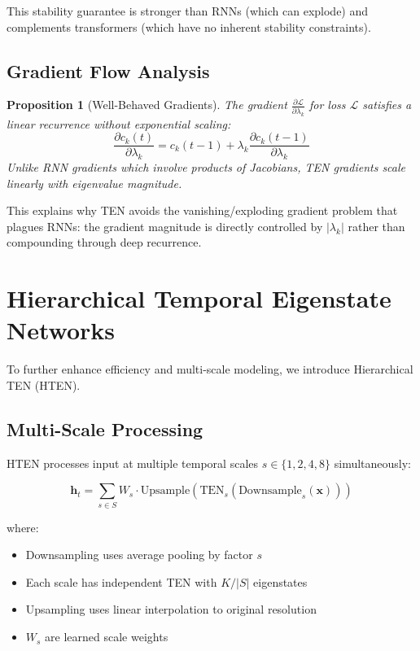 \documentclass[11pt,letterpaper]{article}
\newtheorem{proposition}[theorem]{Proposition}
\begin{document}
This stability guarantee is stronger than RNNs (which can explode) and complements transformers (which have no inherent stability constraints).

\subsection{Gradient Flow Analysis}

\begin{proposition}[Well-Behaved Gradients]
The gradient $\frac{\partial \mathcal{L}}{\partial \lambda_k}$ for loss $\mathcal{L}$ satisfies a linear recurrence without exponential scaling:
\begin{equation}
    \frac{\partial c_k(t)}{\partial \lambda_k} = c_k(t-1) + \lambda_k \frac{\partial c_k(t-1)}{\partial \lambda_k}
\end{equation}
Unlike RNN gradients which involve products of Jacobians, TEN gradients scale linearly with eigenvalue magnitude.
\end{proposition}

This explains why TEN avoids the vanishing/exploding gradient problem that plagues RNNs: the gradient magnitude is directly controlled by $|\lambda_k|$ rather than compounding through deep recurrence.

\section{Hierarchical Temporal Eigenstate Networks}
\label{sec:hten}

To further enhance efficiency and multi-scale modeling, we introduce Hierarchical TEN (HTEN).

\subsection{Multi-Scale Processing}

HTEN processes input at multiple temporal scales $s \in \{1, 2, 4, 8\}$ simultaneously:

\begin{equation}
    \mathbf{h}_t = \sum_{s \in S} W_s \cdot \text{Upsample}\left(\text{TEN}_s\left(\text{Downsample}_s(\mathbf{x})\right)\right)
\end{equation}

where:
\begin{itemize}
    \item Downsampling uses average pooling by factor $s$
    \item Each scale has independent TEN with $K/|S|$ eigenstates
    \item Upsampling uses linear interpolation to original resolution
    \item $W_s$ are learned scale weights
\end{itemize}
\end{document}

